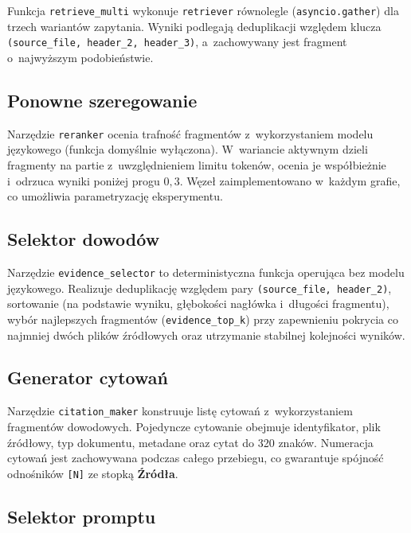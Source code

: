 Funkcja \texttt{retrieve\_multi} wykonuje \texttt{retriever} równolegle
(\texttt{asyncio.gather}) dla trzech wariantów zapytania. Wyniki podlegają
deduplikacji względem klucza \texttt{(source\_file, header\_2, header\_3)},
a~zachowywany jest fragment o~najwyższym podobieństwie.

\subsection{Ponowne szeregowanie}\label{subsec:ponowne-szeregowanie}

Narzędzie \texttt{reranker} ocenia trafność fragmentów z~wykorzystaniem modelu
językowego (funkcja domyślnie wyłączona). W~wariancie aktywnym dzieli fragmenty
na partie z~uwzględnieniem limitu tokenów, ocenia je współbieżnie i~odrzuca
wyniki poniżej progu \(0{,}3\). Węzeł zaimplementowano w~każdym grafie, co
umożliwia parametryzację eksperymentu.

\subsection{Selektor dowodów}\label{subsec:selektor-dowodow}

Narzędzie \texttt{evidence\_selector} to deterministyczna funkcja operująca bez
modelu językowego. Realizuje deduplikację względem pary \texttt{(source\_file,
header\_2)}, sortowanie (na podstawie wyniku, głębokości nagłówka i~długości
fragmentu), wybór najlepszych fragmentów (\texttt{evidence\_top\_k}) przy
zapewnieniu pokrycia co najmniej dwóch plików źródłowych oraz utrzymanie
stabilnej kolejności wyników.

\subsection{Generator cytowań}\label{subsec:generator-cytowan}

Narzędzie \texttt{citation\_maker} konstruuje listę cytowań z~wykorzystaniem
fragmentów dowodowych. Pojedyncze cytowanie obejmuje identyfikator, plik
źródłowy, typ dokumentu, metadane oraz cytat do 320 znaków. Numeracja cytowań
jest zachowywana podczas całego przebiegu, co gwarantuje spójność odnośników
\texttt{[N]} ze stopką \textbf{Źródła}.

\subsection{Selektor promptu}\label{subsec:selektor-promptu}

